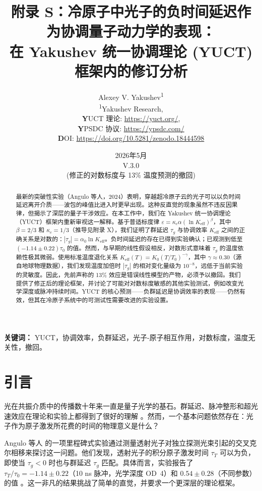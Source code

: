 \documentclass[12pt,a4paper]{article}
\title{\textbf{附录 S：冷原子中光子的负时间延迟作为协调量子动力学的表现：\\ 在 Yakushev 统一协调理论 (YUCT) 框架内的修订分析}}
\author{Alexey V. Yakushev\textsuperscript{1} \\
	\textsuperscript{1}Yakushev Research, \\ 
	\textbf YUCT 理论: \url{https://yuct.org/}, \\ 
	\textbf YPSDC 协议: \url{https://ypsdc.com/}\\
	\textbf DOI: \url{https://doi.org/10.5281/zenodo.18444598}\\
}
\date{2026年5月 \\ \large V.3.0 \\(修正的对数标度与 13\% 温度预测的撤回)}
\newcommand{\Keff}{K_{\mathrm{eff}}}
\newcommand{\kappac}{\kappa_c}
\newcommand{\eps}{\varepsilon}
\newcommand{\betac}{\beta}
\begin{document}
	
	\maketitle
	\newpage
	\begin{abstract}
		\noindent
		最新的突破性实验（Angulo 等人，2024）表明，穿越超冷原子云的光子可以以负时间延迟离开介质——波包的峰值比进入时更早出现。这种反直觉的现象虽然不违反因果律，但揭示了深层的量子干涉效应。在本工作中，我们在 Yakushev 统一协调理论（YUCT）框架内重新审视这一解释。基于普适标度律 \(\eps = \kappac \alpha (\ln\Keff)^{\betac}\)，其中 \(\betac = 2/3\) 和 \(\kappac = 1/3\)（推导见附录 X），我们证明了群延迟 \(\tau_g\) 与协调效率 \(\Keff\) 之间的正确关系是对数的：\(|\tau_g| = \alpha_0 \ln\Keff\)。负时间延迟的存在已得到实验确认；已观测到低至 \((-1.14 \pm 0.22)\tau_0\) 的值。然而，与早期的线性假设相反，对数形式意味着 \(\tau_g\) 的温度依赖性极其微弱。使用标准温度退化关系 \(\Keff(T) = K_0 (T/T_0)^{-\gamma}\)，其中 \(\gamma \approx 0.30\)（源自地球物理数据），我们发现温度加倍时 \(|\tau_g|\) 的相对变化量级为 \(10^{-8}\)，远低于当前实验的灵敏度。因此，先前声称的 13\% 效应是错误线性模型的产物，必须予以撤回。我们提供了修正后的理论框架，并讨论了可能对对数标度敏感的其他实验测试，例如改变光学深度或脉冲持续时间。YUCT 的核心预测——负群延迟是协调效率的表现——仍然有效，但其在冷原子系统中的可测试性需要改进的实验设置。
	\end{abstract}
	
	\noindent\textbf{关键词：} YUCT，协调效率，负群延迟，光子-原子相互作用，对数标度，温度无关性，撤回。
	
	\newpage
	\tableofcontents
	\newpage
	
	\section{引言}
	
	光在共振介质中的传播数十年来一直是量子光学的基石。群延迟、脉冲整形和超光速效应在理论和实验上都得到了很好的理解 \cite{Brillouin1960, Milonni2004}。然而，一个基本问题依然存在：光子作为原子激发所花费的时间的物理意义是什么？
	
	Angulo 等人 \cite{Angulo2024} 的一项里程碑式实验通过测量透射光子对独立探测光束引起的交叉克尔相移来探讨这一问题。他们发现，透射光子的积分原子激发时间 \(\tau_T\) 可以为负，即使当 \(\tau_g < 0\) 时也与群延迟 \(\tau_g\) 匹配。具体而言，实验报告了 \(\tau_T/\tau_0 = -1.14 \pm 0.22\)（10 ns 脉冲，光学深度 OD~4）和 \(0.54 \pm 0.28\)（不同参数）的值 \cite{Angulo2024, Nixon2024}。这一非凡的结果挑战了简单的直觉，并要求一个更深层的理论框架。
	
\end{document}
